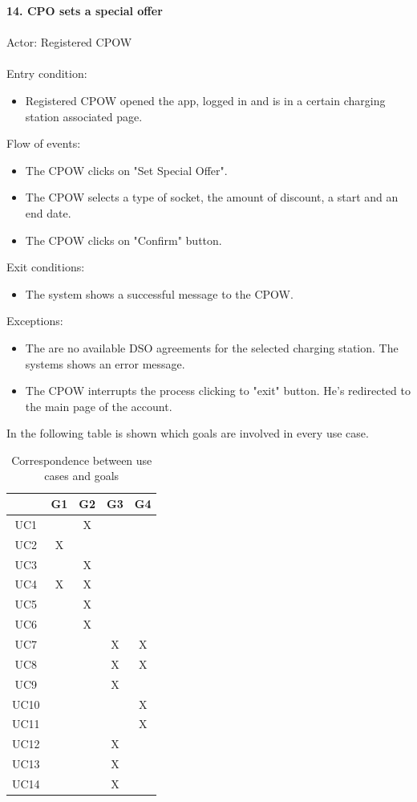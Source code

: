 \documentclass[a4paper]{report}
\begin{document}
\textbf{14. CPO sets a special offer}\label{uc:8}
\\ \\
Actor: Registered CPOW \\ \\
Entry condition:
\begin{itemize}
\item Registered CPOW opened the app, logged in and is in a certain charging station associated page.
\end{itemize}
Flow of events:
\begin{itemize}
\item The CPOW clicks on "Set Special Offer".
\item The CPOW selects a type of socket, the amount of discount, a start and an end date.
\item The CPOW clicks on "Confirm" button.
\end{itemize}
Exit conditions:
\begin{itemize}
\item The system shows a successful message to the CPOW.
\end{itemize}
Exceptions:
\begin{itemize}
\item The are no available DSO agreements for the selected charging station. The systems shows an error message.
\item The CPOW interrupts the process clicking to "exit" button. He's redirected to the main page of the account.
\end{itemize}

In the following table is shown which goals are involved in every use case.
\begin{table}[H]
  \centering
  \begin{tabular}{|c|c|c|c|c|}
    \cline{2-5}
    \multicolumn{1}{c|}{} & G1 & G2 & G3 & G4 \\ \hline
    UC1 &   & X &   &   \\ \hline
    UC2 & X &   &   &   \\ \hline
    UC3 &   & X &   &   \\ \hline
    UC4 & X & X &   &   \\ \hline
    UC5 &   & X &   &   \\ \hline
    UC6 &   & X &   &   \\ \hline
    UC7 &   &   & X & X \\ \hline
    UC8 &   &   & X & X \\ \hline
    UC9 &   &   & X &   \\ \hline
    UC10 &   &   &   & X \\ \hline
    UC11 &   &   &   & X \\ \hline
    UC12 &   &   & X &   \\ \hline
    UC13 &   &   & X &   \\ \hline
    UC14 &   &   & X &   \\ \hline
  \end{tabular}
  \caption{Correspondence between use cases and goals}
\end{table}
\end{document}
